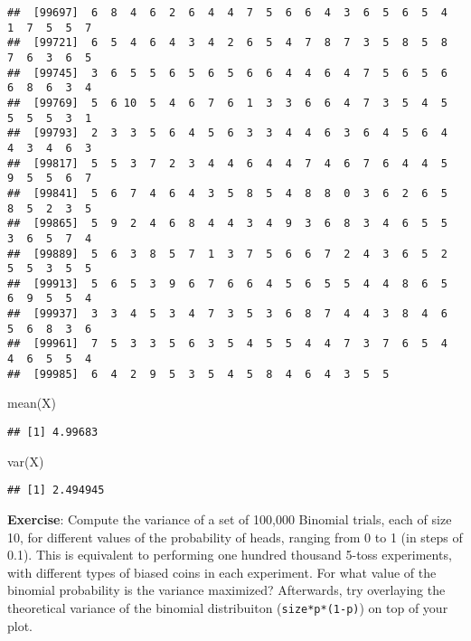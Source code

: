 \documentclass[
]{book}
\newenvironment{Shaded}{\begin{snugshade}}{\end{snugshade}}
\newcommand{\FunctionTok}[1]{\textcolor[rgb]{0.00,0.00,0.00}{#1}}
\newcommand{\NormalTok}[1]{#1}
\begin{document}
\begin{verbatim}
##  [99697]  6  8  4  6  2  6  4  4  7  5  6  6  4  3  6  5  6  5  4  1  7  5  5  7
##  [99721]  6  5  4  6  4  3  4  2  6  5  4  7  8  7  3  5  8  5  8  7  6  3  6  5
##  [99745]  3  6  5  5  6  5  6  5  6  6  4  4  6  4  7  5  6  5  6  6  8  6  3  4
##  [99769]  5  6 10  5  4  6  7  6  1  3  3  6  6  4  7  3  5  4  5  5  5  5  3  1
##  [99793]  2  3  3  5  6  4  5  6  3  3  4  4  6  3  6  4  5  6  4  4  3  4  6  3
##  [99817]  5  5  3  7  2  3  4  4  6  4  4  7  4  6  7  6  4  4  5  9  5  5  6  7
##  [99841]  5  6  7  4  6  4  3  5  8  5  4  8  8  0  3  6  2  6  5  8  5  2  3  5
##  [99865]  5  9  2  4  6  8  4  4  3  4  9  3  6  8  3  4  6  5  5  3  6  5  7  4
##  [99889]  5  6  3  8  5  7  1  3  7  5  6  6  7  2  4  3  6  5  2  5  5  3  5  5
##  [99913]  5  6  5  3  9  6  7  6  6  4  5  6  5  5  4  4  8  6  5  6  9  5  5  4
##  [99937]  3  3  4  5  3  4  7  3  5  3  6  8  7  4  4  3  8  4  6  5  6  8  3  6
##  [99961]  7  5  3  3  5  6  3  5  4  5  5  4  4  7  3  7  6  5  4  4  6  5  5  4
##  [99985]  6  4  2  9  5  3  5  4  5  8  4  6  4  3  5  5
\end{verbatim}

\begin{Shaded}
\begin{Highlighting}[]
\FunctionTok{mean}\NormalTok{(X)}
\end{Highlighting}
\end{Shaded}

\begin{verbatim}
## [1] 4.99683
\end{verbatim}

\begin{Shaded}
\begin{Highlighting}[]
\FunctionTok{var}\NormalTok{(X)}
\end{Highlighting}
\end{Shaded}

\begin{verbatim}
## [1] 2.494945
\end{verbatim}

\textbf{Exercise}: Compute the variance of a set of 100,000 Binomial trials, each of size 10, for different values of the probability of heads, ranging from 0 to 1 (in steps of 0.1). This is equivalent to performing one hundred thousand 5-toss experiments, with different types of biased coins in each experiment. For what value of the binomial probability is the variance maximized? Afterwards, try overlaying the theoretical variance of the binomial distribuiton (\texttt{size*p*(1-p)}) on top of your plot.
\end{document}
